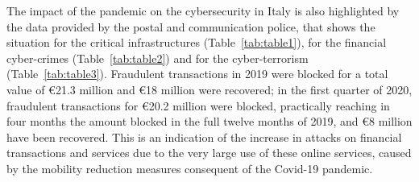 \documentclass{easychair}
\begin{document}
The impact of the pandemic on the cybersecurity in Italy is also highlighted by the data
provided by the postal and communication police, that shows the situation for the
critical infrastructures (Table~\ref{tab:table1}), for the financial cyber-crimes
(Table~\ref{tab:table2}) and for the cyber-terrorism (Table~\ref{tab:table3}). 
Fraudulent transactions in 2019 were blocked for a total value of \euro 21.3 million and \euro 18 million were recovered; in the first quarter of 
2020, fraudulent transactions for \euro 20.2 million were blocked,
practically reaching in four months the amount
blocked in the full twelve months of 2019, and \euro 8 million have been
recovered. This is an indication of the increase in attacks on financial transactions
and services due to the very large use of these online services, caused by the mobility reduction
measures consequent of the Covid-19 pandemic.

\begin{table}[h]
  \begin{center}
    \end{center}
	
	\caption{Data of critical structure protection collected by Italian postal and communication police~\cite{oad20}.}									
	\label{tab:table1}									
\end{table}	
\end{document}
